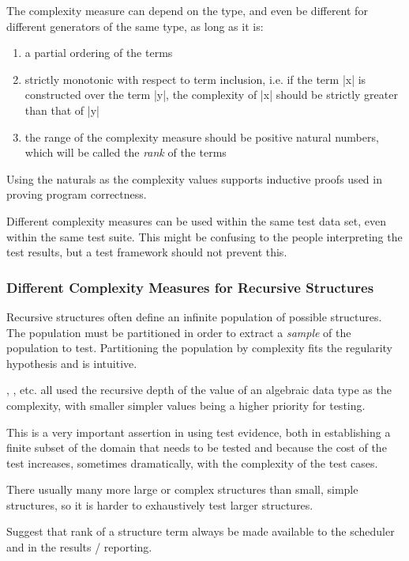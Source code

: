 The complexity measure can depend on the type,
and even be different for different generators of the same type,
as long as it is:

\begin{enumerate}
\item a partial ordering of the terms
\item strictly monotonic with respect to term inclusion,
i.e. if the term |x| is constructed over the term |y|, the complexity of |x| should be strictly greater than that of |y|
\item the range of the complexity measure should be positive natural numbers,
which will be called the \emph{rank} of the terms
\end{enumerate}

Using the naturals as the complexity values supports inductive proofs
used in proving program correctness.

Different complexity measures can be used within the same test data set,
even within the same test suite.
This might be confusing to the people interpreting the test results,
but a test framework should not prevent this.

\subsubsection{Different Complexity Measures for Recursive Structures}

Recursive structures often define an infinite population of possible structures.
The population must be partitioned
in order to extract a \emph{sample} of the population to test.
Partitioning the population by complexity fits the regularity hypothesis
and is intuitive.

\QC, \SC, etc. all used the recursive depth of the value of an algebraic data type
as the complexity, with smaller simpler values being a higher priority for testing.

This is a very important assertion in using test evidence,
both in establishing a finite subset of the domain that needs to be tested
and because the cost of the test increases,
sometimes dramatically, with the complexity of the test cases.

There usually many more large or complex structures than small, simple structures,
so it is harder to exhaustively test larger structures.

Suggest that rank of a structure term always be made available to the scheduler
and in the results / reporting.

